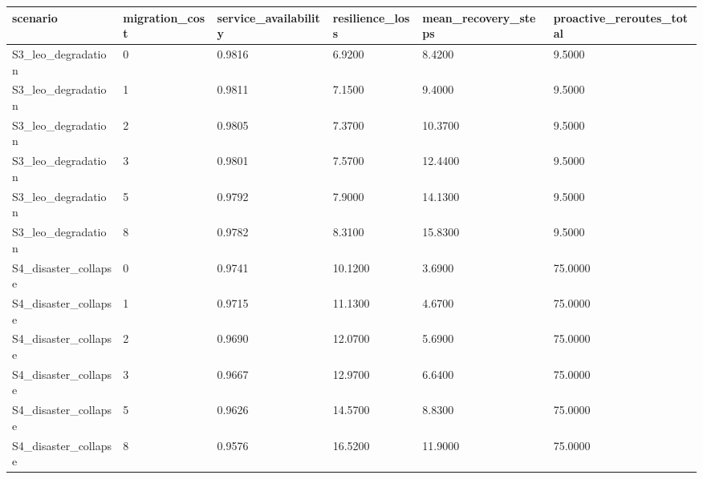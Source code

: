 \begin{tabular}{llllll}
\toprule
scenario & migration\_cost & service\_availability & resilience\_loss & mean\_recovery\_steps & proactive\_reroutes\_total \\
\midrule
S3\_leo\_degradation & 0 & 0.9816 & 6.9200 & 8.4200 & 9.5000 \\
S3\_leo\_degradation & 1 & 0.9811 & 7.1500 & 9.4000 & 9.5000 \\
S3\_leo\_degradation & 2 & 0.9805 & 7.3700 & 10.3700 & 9.5000 \\
S3\_leo\_degradation & 3 & 0.9801 & 7.5700 & 12.4400 & 9.5000 \\
S3\_leo\_degradation & 5 & 0.9792 & 7.9000 & 14.1300 & 9.5000 \\
S3\_leo\_degradation & 8 & 0.9782 & 8.3100 & 15.8300 & 9.5000 \\
S4\_disaster\_collapse & 0 & 0.9741 & 10.1200 & 3.6900 & 75.0000 \\
S4\_disaster\_collapse & 1 & 0.9715 & 11.1300 & 4.6700 & 75.0000 \\
S4\_disaster\_collapse & 2 & 0.9690 & 12.0700 & 5.6900 & 75.0000 \\
S4\_disaster\_collapse & 3 & 0.9667 & 12.9700 & 6.6400 & 75.0000 \\
S4\_disaster\_collapse & 5 & 0.9626 & 14.5700 & 8.8300 & 75.0000 \\
S4\_disaster\_collapse & 8 & 0.9576 & 16.5200 & 11.9000 & 75.0000 \\
\bottomrule
\end{tabular}

